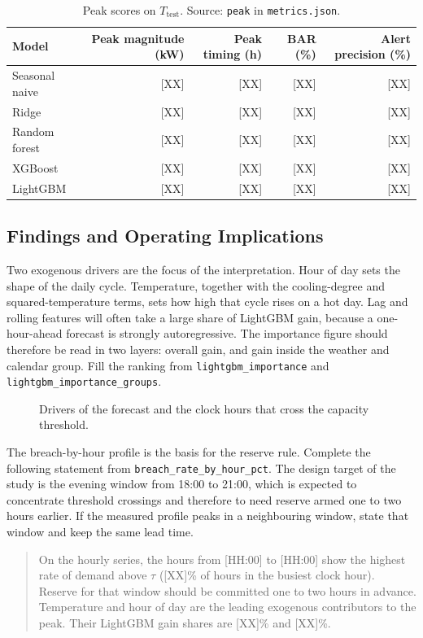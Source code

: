 \begin{table}[h]
  \centering
  \small
  \begin{tabular}{@{}lrrrr@{}}
    \toprule
    Model & Peak magnitude (kW) & Peak timing (h) & BAR (\%) & Alert precision (\%) \\
    \midrule
    Seasonal naive & [XX] & [XX] & [XX] & [XX] \\
    Ridge & [XX] & [XX] & [XX] & [XX] \\
    Random forest & [XX] & [XX] & [XX] & [XX] \\
    XGBoost & [XX] & [XX] & [XX] & [XX] \\
    LightGBM & [XX] & [XX] & [XX] & [XX] \\
    \bottomrule
  \end{tabular}
  \caption{Peak scores on \(T_{\mathrm{test}}\). Source: \texttt{peak} in \texttt{metrics.json}.}
  \label{tab:peak}
\end{table}

\subsection{Findings and Operating Implications}
\label{sec:insights}

Two exogenous drivers are the focus of the interpretation. Hour of day sets
the shape of the daily cycle. Temperature, together with the cooling-degree
and squared-temperature terms, sets how high that cycle rises on a hot day.
Lag and rolling features will often take a large share of LightGBM gain,
because a one-hour-ahead forecast is strongly autoregressive. The importance
figure should therefore be read in two layers: overall gain, and gain inside
the weather and calendar group. Fill the ranking from
\texttt{lightgbm\_importance} and \texttt{lightgbm\_importance\_groups}.

\begin{figure}[h]
  \centering
  \caption{Drivers of the forecast and the clock hours that cross the capacity threshold.}
  \label{fig:importance}
\end{figure}

The breach-by-hour profile is the basis for the reserve rule. Complete the
following statement from \texttt{breach\_rate\_by\_hour\_pct}. The design
target of the study is the evening window from 18:00 to 21:00, which is
expected to concentrate threshold crossings and therefore to need reserve
armed one to two hours earlier. If the measured profile peaks in a
neighbouring window, state that window and keep the same lead time.

\begin{quote}
On the hourly series, the hours from [HH:00] to [HH:00] show the highest
rate of demand above \(\tau\) ([XX]\% of hours in the busiest clock hour).
Reserve for that window should be committed one to two hours in advance.
Temperature and hour of day are the leading exogenous contributors to the
peak. Their LightGBM gain shares are [XX]\% and [XX]\%.
\end{quote}
